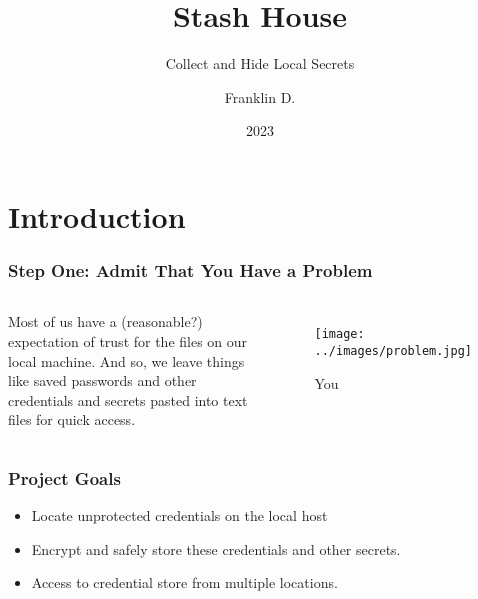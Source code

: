 \documentclass[aspectratio=169]{beamer}
\title{Stash House}
\subtitle{Collect and Hide Local Secrets}
\author{Franklin D.}
\institute{DE:AD:10:C5}
\date{2023}
\makeatletter
\def\sectionsubtitle#1{\gdef\@sectionsubtitle{#1}}
\gdef\@sectionsubtitle{}
\makeatother
\begin{document}
	
{
%
\begin{frame}
	\titlepage
\end{frame}
}




\sectionsubtitle{The Lost Art of Keeping a Secret}
\section{Introduction}

\begin{frame}
	\frametitle{Step One: Admit That You Have a Problem}
	
\begin{columns}

    Most of us have a (reasonable?) expectation of trust for the files on our local machine. And so, we leave things like saved passwords and other credentials and secrets pasted into text files for quick access.
	
	\begin{figure}
		\centering
		\texttt{[image: ../images/problem.jpg]}
		\caption{You}
		\label{fig:question}
	\end{figure}
	
	\end{columns}

	
\end{frame}

\begin{frame}
	\frametitle{Project Goals}
    \begin{itemize}
    	\item Locate unprotected credentials on the local host
        \item Encrypt and safely store these credentials and other secrets.
        \item Access to credential store from multiple locations.
    \end{itemize}


\end{frame}
\end{document}
